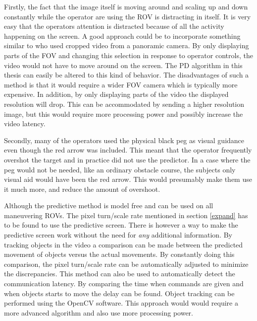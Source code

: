 Firstly, the fact that the image itself is moving around and scaling up and down constantly while the operator are using the ROV is distracting in itself. It is very easy that the operators attention is distracted because of all the activity happening on the screen. A good approach could be to incorporate something similar to \citet{Baldwin1999} who used cropped video from a panoramic camera. By only displaying parts of the FOV and changing this selection in response to operator controls, the video would not have to move around on the screen. The PD algorithm in this thesis can easily be altered to this kind of behavior. The disadvantages of such a method is that it would require a wider FOV camera which is typically more expensive. In addition, by only displaying parts of the video the displayed resolution will drop. This can be accommodated by sending a higher resolution image, but this would require more processing power and possibly increase the video latency.

Secondly, many of the operators used the physical black peg as visual guidance even though the red arrow was included. This meant that the operator frequently overshot the target and in practice did not use the predictor. In a case where the peg would not be needed, like an ordinary obstacle course, the subjects only visual aid would have been the red arrow. This would presumably make them use it much more, and reduce the amount of overshoot.

Although the predictive method is model free and can be used on all maneuvering ROVs. The pixel turn/scale rate mentioned in section \ref{expand} has to be found to use the predictive screen. There is however a way to make the predictive screen work without the need for \textit{any} additional information. By tracking objects in the video a comparison can be made between the predicted movement of objects versus the actual movements. By constantly doing this comparison, the pixel turn/scale rate can be automatically adjusted to minimize the discrepancies. This method can also be used to automatically detect the communication latency. By comparing the time when commands are given and when objects starts to move the delay can be found. Object tracking can be performed using the OpenCV software. This approach would would require a more advanced algorithm and also use more processing power.

